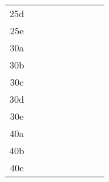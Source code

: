 \documentclass[12pt]{article}
\begin{document}
\begin{sidewaystable}[h]
\begin{tabular}{|c|c|c||c|c||c|c||c|c|}
25d & \hspace{1.7cm} & & \hspace{1.7cm} & & \hspace{1.7cm} & & \hspace{1.7cm} & \\
25e & \hspace{1.7cm} & & \hspace{1.7cm} & & \hspace{1.7cm} & & \hspace{1.7cm} & \\
\hline
30a & \hspace{1.7cm} & & \hspace{1.7cm} & & \hspace{1.7cm} & & \hspace{1.7cm} & \\
30b & \hspace{1.7cm} & & \hspace{1.7cm} & & \hspace{1.7cm} & & \hspace{1.7cm} & \\
30c & \hspace{1.7cm} & & \hspace{1.7cm} & & \hspace{1.7cm} & & \hspace{1.7cm} & \\
30d & \hspace{1.7cm} & & \hspace{1.7cm} & & \hspace{1.7cm} & & \hspace{1.7cm} & \\
30e & \hspace{1.7cm} & & \hspace{1.7cm} & & \hspace{1.7cm} & & \hspace{1.7cm} & \\
\hline
40a & \hspace{1.7cm} & & \hspace{1.7cm} & & \hspace{1.7cm} & & \hspace{1.7cm} & \\
40b & \hspace{1.7cm} & & \hspace{1.7cm} & & \hspace{1.7cm} & & \hspace{1.7cm} & \\
40c & \hspace{1.7cm} & & \hspace{1.7cm} & & \hspace{1.7cm} & & \hspace{1.7cm} & \\

\end{tabular}
\end{sidewaystable}
\end{document}
